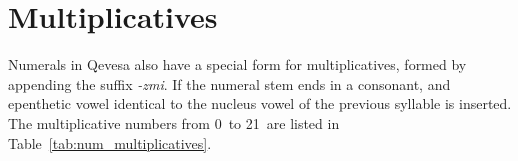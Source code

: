 \documentclass[grammar]{subfiles}
\begin{document}
	\begin{table}[htpb]\small\capstart
		\begin{center}
			\qquad
			\caption{Ordinal numerals from 0\dec\ to 21\dec\label{tab:num_ordinals}}
		\end{center}
	\end{table}

	\section{Multiplicatives}
	\label{sec:num_multiplicatives}

	Numerals in Qevesa also have a special form for multiplicatives, formed by appending the suffix \emph{-zmi}. If the numeral stem ends in a consonant, and epenthetic vowel identical to the nucleus vowel of the previous syllable is inserted. The multiplicative numbers from 0\dec\ to 21\dec\ are listed in Table~\ref{tab:num_multiplicatives}.
	
\end{document}
